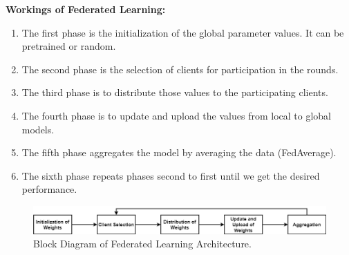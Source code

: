 \documentclass[conference]{IEEEtran}
\begin{document}
\textbf{Workings of Federated Learning:}
\begin{enumerate}
\item The first phase is the initialization of the global parameter values. It can be pretrained or random.
\item The second phase is the selection of clients for participation in the rounds.
\item The third phase is to distribute those values to the participating clients.
\item The fourth phase is to update and upload the values from local to global models.
\item The fifth phase aggregates the model by averaging the data (FedAverage).
\item The sixth phase repeats phases second to first until we get the desired performance. 
\end{enumerate}
\begin{figure}[htp]
        \centering
        \includegraphics[scale=.28]{Images/Block Diagram.png}
        \caption{Block Diagram of Federated Learning Architecture.}
    \end{figure}
\end{document}
